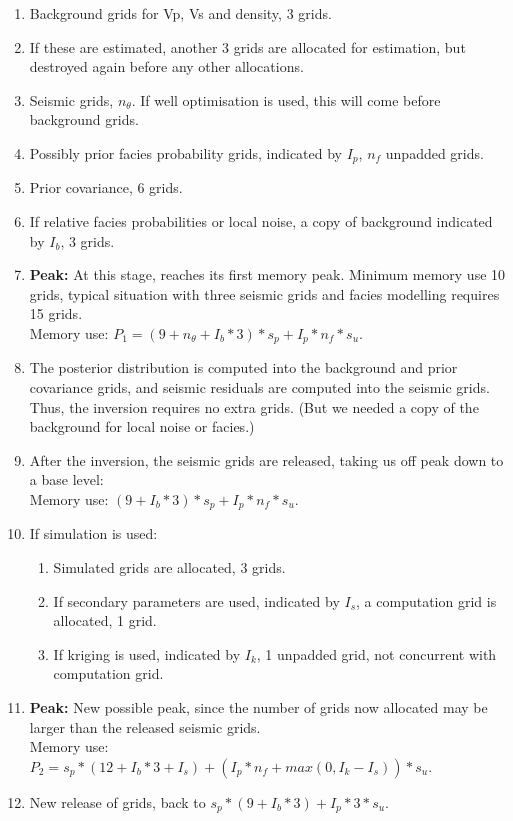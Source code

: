 \begin{enumerate}
\item Background grids for Vp, Vs and density, 3 grids.
\item If these are estimated, another 3 grids are allocated for estimation, but destroyed again before any other allocations.
\item Seismic grids, $n_\theta$. If well optimisation is used, this will come before background grids.
\item Possibly prior facies probability grids, indicated by $I_p$, $n_f$ unpadded grids.
\item Prior covariance, 6 grids.
\item If relative facies probabilities or local noise, a copy of background indicated by $I_b$, 3 grids.
\item {\bf Peak:} At this stage, \crava reaches its first memory peak. Minimum memory use 10 grids, typical situation with three seismic grids and facies modelling requires 15 grids. \\ 
    Memory use: $P_1 = (9+n_\theta+I_b*3)*s_p+I_p*n_f*s_u$.
\item The posterior distribution is computed into the background and prior covariance grids, and seismic residuals are computed into the seismic grids. Thus, the inversion requires no extra grids. (But we needed a copy of the background for local noise or facies.)
\item After the inversion, the seismic grids are released, taking us off peak down to a base level: \\ Memory use: $(9+I_b*3)*s_p+I_p*n_f*s_u$.
\item If simulation is used:
\begin{enumerate}
\item Simulated grids are allocated, 3 grids.
\item If secondary parameters are used, indicated by $I_s$, a computation grid is allocated, 1 grid.
\item If kriging is used, indicated by $I_k$, 1 unpadded grid, not concurrent with computation grid. 
\end{enumerate}
\item {\bf Peak:} New possible peak, since the number of grids now allocated may be larger than the released seismic grids. \\
    Memory use: $P_2 = s_p*(12+I_b*3+I_s)+(I_p*n_f + max(0,I_k-I_s))*s_u$.
\item New release of grids, back to $s_p*(9+I_b*3)+I_p*3*s_u$.

\end{enumerate}
